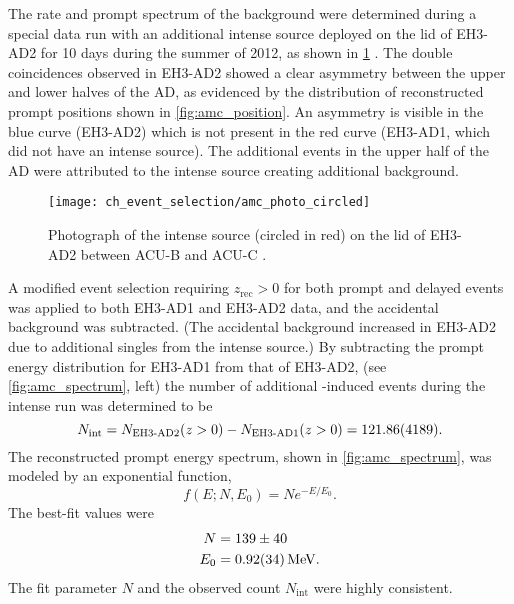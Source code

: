 The rate and prompt spectrum of the \amc{} background were determined
during a special data run with an additional intense \amc{} source
deployed on the lid of EH3-AD2 for 10 days during the summer of 2012,
as shown in \cref{fig:amc_photo} \cite{nh2016technote}.
The double coincidences observed in EH3-AD2 showed a clear asymmetry
between the upper and lower halves of the AD,
as evidenced by the distribution of reconstructed prompt positions
shown in \cref{fig:amc_position}.
An asymmetry is visible in the blue curve (EH3-AD2)
which is not present in the red curve
(EH3-AD1, which did not have an intense \amc{} source).
The additional events in the upper half of the AD
were attributed to the intense \amc{} source creating additional background.

\begin{figure}
    \centering
    \texttt{[image: ch\_event\_selection/amc\_photo\_circled]}
    \caption[Intense \amc{} source photograph]{
        Photograph of the intense \amc{} source (circled in red)
        on the lid of EH3-AD2 between ACU-B and ACU-C \cite{amc_photo}.
    }
    \label{fig:amc_photo}
\end{figure}

A modified event selection requiring $z_\text{rec} > 0$
for both prompt and delayed events
was applied to both EH3-AD1 and EH3-AD2 data,
and the accidental background was subtracted.
(The accidental background increased in EH3-AD2 due to additional singles
from the intense \amc{} source.)
By subtracting the prompt energy distribution for EH3-AD1 from that of EH3-AD2,
(see \cref{fig:amc_spectrum}, left)
the number of additional \amc{}-induced events during the intense run
was determined to be
\begin{equation}\label{eq:amc_intense}
    N_\text{int} = N_\text{EH3-AD2}(z > 0) - N_\text{EH3-AD1}(z > 0)
    = \num{121.86\pm41.89}.
\end{equation}
The reconstructed prompt energy spectrum, shown in \cref{fig:amc_spectrum},
was modeled by an exponential function,
\begin{equation}\label{eq:amc_spec_fit}
    f(E; N, E_0) = N e^{-E/E_0}.
\end{equation}
The best-fit values were
\begin{align}\label{eq:amc_spec_params}
    \begin{split}
        N &= 139\pm40 \\
        E_0 &= \SI{0.92\pm0.34}{\MeV}.
    \end{split}
\end{align}
The fit parameter $N$ and the observed count $N_\text{int}$
were highly consistent.

